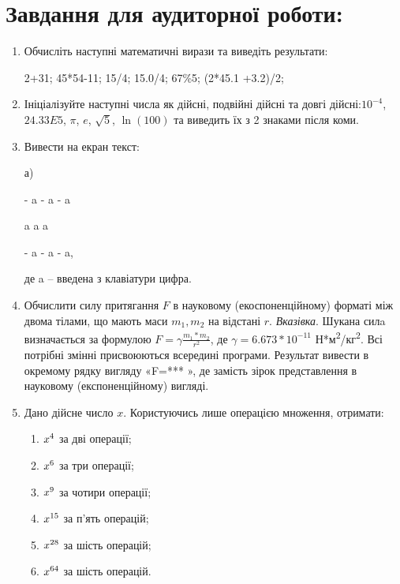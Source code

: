 \documentclass[a5paper,titlepage,openany,twoside,draft]{book_unv}%
\makeatletter
\newcommand{\xslalph}[1]{\expandafter\@xslalph\csname c@#1\endcsname}
\newcommand{\@xslalph}[1]{%
    \ifcase#1\or а\or б\or в\or г\or д\or e\or є\or ж\or з\or i%
    \or й\or к\or л\or м\or н\or о\or п\or р\or с\or т%
    \or у\or ф\or х\or ц\or ч\or ш\or ю\or я\or аа\or бб\or вв%
    \else\@ctrerr\fi%
}
\makeatother
\begin{document}
\section{Завдання для аудиторної роботи:}

\begin{enumerate}
\def\labelenumi{\arabic{enumi}.}
\item
  Обчисліть наступні математичні вирази та виведіть результати:

2+31; 45*54-11; 15/4; 15.0/4; 67\%5; (2*45.1 +3.2)/2;

\item
  Ініціалізуйте наступні числа як дійсні, подвійні дійсні та довгі
  дійсні:$10^{-4}$, $24.33E5$, $\pi$, $e$, $\sqrt{5}$,
  $\ln(100)$ та виведить їх з 2 знаками після коми.

\item
  Вивести на екран текст:

а) 

-\/ a -\/ a -\/ a

a \textbar{} a \textbar{} a

-\/ a -\/ a -\/ a,

де a -- введена з клавіатури цифра.

\item
  Обчислити силу притягання $F$ в науковому (екоспоненційному) форматі між двома тілами,
  що мають маси $m_{1},m_{2}$ на відстані $r$. 
  \emph{\emph{Вказівка}}. Шукана силa визначається за формулою 
  $ F=\gamma \frac{m_{1}*m_{2}}{r^{2}}$,
  де $\gamma = 6.673*10^{-11}$ Н*м\textsuperscript{2}/кг\textsuperscript{2}. Всі потрібні змінні
  присвоюються всередині програми. Результат вивести в окремому рядку
  вигляду «F=*** », де замість зірок представлення в науковому
  (експоненційному) вигляді.

\item
  Дано дійсне число \(x\). Користуючись лише операцією множення,
  отримати:
  \begin{enumerate}[label=\xslalph*)]
  \item  \(x\textsuperscript{4}\) за дві операції; 
  \item  \(x\textsuperscript{6}\) за три операції;
  \item \(x\textsuperscript{9}\) за чотири операції; 
  \item \(x\textsuperscript{15}\) за п'ять операцій;
  \item \(x\textsuperscript{28}\) за шість операцій; 
  \item \(x\textsuperscript{64}\) за шість операцій.
  \end{enumerate}


\end{enumerate}
\end{document}
